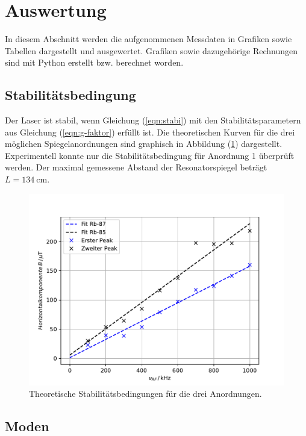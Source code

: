\newpage
\section{Auswertung}
\label{sec:Auswertung}
In diesem Abschnitt werden die aufgenommenen Messdaten in Grafiken sowie Tabellen dargestellt und ausgewertet. Grafiken sowie dazugehörige Rechnungen sind mit Python \cite{python} erstellt bzw. berechnet worden.
\subsection{Stabilitätsbedingung}
\label{sec:stab}

Der Laser ist stabil, wenn Gleichung (\ref{eqn:stabi}) mit den Stabilitätsparametern aus Gleichung (\ref{eqn:g-faktor}) erfüllt ist.
Die theoretischen Kurven für die drei möglichen Spiegelanordnungen sind graphisch in Abbildung (\ref{fig:plot1}) dargestellt.
Experimentell konnte nur die Stabilitätsbedingung für Anordnung 1 überprüft werden.
Der maximal gemessene Abstand der Resonatorspiegel beträgt $L = \SI{134}{\centi\meter}$.

\begin{figure}
  \centering
  \includegraphics[scale=0.7]{fig/plot1.pdf}
  \caption{Theoretische Stabilitätsbedingungen für die drei Anordnungen.}
  \label{fig:plot1}
\end{figure}

\FloatBarrier
\subsection{Moden}
\label{sec:tem}

